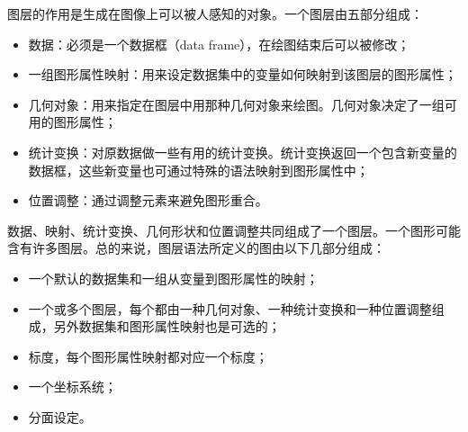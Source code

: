 \documentclass[11pt,a4paper,twoside]{book}
\begin{document}
图层的作用是生成在图像上可以被人感知的对象。一个图层由五部分组成：
\begin{itemize}
  \item 数据：必须是一个数据框（data frame），在绘图结束后可以被修改；
  \item 一组图形属性映射：用来设定数据集中的变量如何映射到该图层的图形属性；
  \item 几何对象：用来指定在图层中用那种几何对象来绘图。几何对象决定了一组可用的图形属性；
  \item 统计变换：对原数据做一些有用的统计变换。统计变换返回一个包含新变量的数据框，这些新变量也可通过特殊的语法映射到图形属性中；
  \item 位置调整：通过调整元素来避免图形重合。
\end{itemize}

数据、映射、统计变换、几何形状和位置调整共同组成了一个图层。一个图形可能含有许多图层。总的来说，图层语法所定义的图由以下几部分组成：

\begin{itemize}
  \item 一个默认的数据集和一组从变量到图形属性的映射；
  \item 一个或多个图层，每个都由一种几何对象、一种统计变换和一种位置调整组成，另外数据集和图形属性映射也是可选的；
  \item 标度，每个图形属性映射都对应一个标度；
  \item 一个坐标系统；
  \item 分面设定。
\end{itemize}

\noindent
{}
\end{document}

